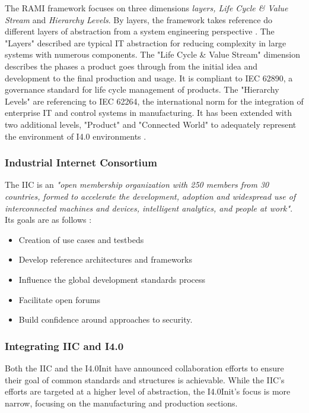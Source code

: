 The \ac{RAMI} framework focuses on three dimensions \emph{layers, Life Cycle \& Value Stream} and \emph{Hierarchy Levels}. By layers, the framework takes reference do different layers of abstraction from a system engineering perspective \cite{Hankel:2015}. 
The "Layers" described are typical IT abstraction for reducing complexity in large systems with numerous components. 
The "Life Cycle \& Value Stream" dimension describes the phases a product goes through from the initial idea and development to the final production and usage. It is compliant to IEC 62890, a governance standard for life cycle management of products.
The "Hierarchy Levels" are referencing to IEC 62264, the international norm for the integration of enterprise IT and control systems in manufacturing. It has been extended with two additional levels, "Product" and "Connected World" to adequately represent the environment of \ac{I4.0} environments \cite{Hankel:2015}.


\subsubsection{Industrial Internet Consortium}
The IIC is an \emph{"open membership organization with 250 members from 30 countries, formed to accelerate the development, adoption and widespread use of interconnected machines and devices, intelligent analytics, and people at work"}\cite{iic-progress:2016}. Its goals are as follows \cite{iic-aboutus:2016}:

\begin{itemize}
	\item  Creation of use cases and testbeds
\item  Develop reference architectures and frameworks
\item  Influence the global development standards process
\item  Facilitate open forums
\item  Build confidence around approaches to security.
\end{itemize}


\subsubsection{Integrating IIC and I4.0}

Both the \ac{IIC} and the \ac{I4.0Init} have announced collaboration efforts to ensure their goal of common standards and structures is achievable. While the IIC's efforts are targeted at a higher level of abstraction, the \ac{I4.0Init}'s focus is more narrow, focusing on the manufacturing and production sections. 

